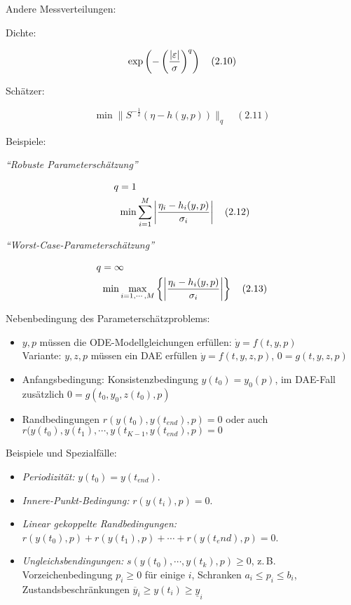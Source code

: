 Andere Messverteilungen:

Dichte:

\[\exp\left(-\left(\frac{|\varepsilon|}{\sigma}\right)^q\right) \quad (2.10)\]

Schätzer:

\[ \min \|S^{-\frac 12} (\eta-h(y,p)) \|_q \quad (2.11)\]

Beispiele:

\emph{"`Robuste Parameterschätzung"'}

\begin{align*}
q &= 1 \\
& \min \sum_{i=1}^M \left| \frac{\eta_i-h_i(y,p)}{\sigma_i} \right| \quad (2.12)
\end{align*}


\emph{"`Worst-Case-Parameterschätzung"'}

\begin{align*}
q &= \infty \\
& \min \max_{i=1,\cdots,M} \left\{ \left| \frac{\eta_i-h_i(y,p)}{\sigma_i} \right| \right\} \quad (2.13)
\end{align*}

Nebenbedingung des Parameterschätzproblems:

\begin{itemize}
\item $y,p$ müssen die ODE-Modellgleichungen erfüllen: $\dot y = f(t,y,p)$ \\
Variante: $y,z,p$ müssen ein DAE erfüllen $\dot y = f(t,y,z,p)$, $0=g(t,y,z,p)$
\item Anfangsbedingung: Konsistenzbedingung $y(t_0) = y_0(p)$, im DAE-Fall zusätzlich $0=g(t_0,y_0,z(t_0),p)$
\item Randbedingungen $r(y(t_0),y(t_{end}),p) = 0$ oder auch $r(y(t_0),y(t_1),\cdots,y(t_{K-1}, y(t_{end}),p) = 0$
\end{itemize}


Beispiele und Spezialfälle:

\begin{itemize}
\item \emph{Periodizität:} $y(t_0) = y(t_{end})$.
\item \emph{Innere-Punkt-Bedingung:} $r(y(t_i),p) = 0$.
\item \emph{Linear gekoppelte Randbedingungen:} $r(y(t_0),p) + r(y(t_1),p) + \cdots + r(y(t_end),p) = 0$.
\item \emph{Ungleichsbendingungen:} $s(y(t_0), \cdots, y(t_k), p) \geq 0$, z.\,B. Vorzeichenbedingung $p_i \geq 0$ für einige $i$, Schranken $a_i \leq p_i \leq b_i$, Zustandsbeschränkungen $\overline y_i \geq y(t_i) \geq \underline y_i$
\end{itemize}

